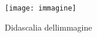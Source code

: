 \begin{figure}[H]
	\centering
	\texttt{[image: immagine]}
	\caption{Didascalia dellimmagine}
\end{figure}